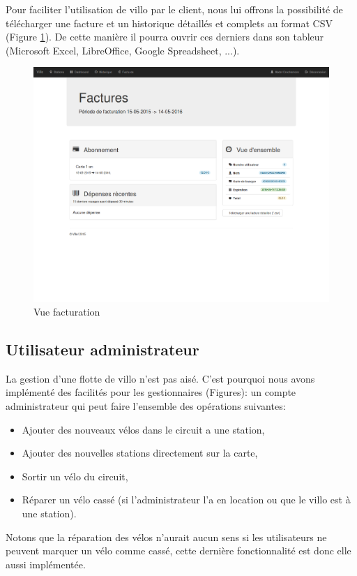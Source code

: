 \documentclass[a4paper,10pt]{article}
\begin{document}
Pour faciliter l'utilisation de villo par le client, nous lui offrons la possibilité
de télécharger une facture et un historique détaillés et complets au format CSV (Figure \ref{fig:factures}).
De cette manière il pourra ouvrir ces derniers dans son tableur (Microsoft Excel,
LibreOffice, Google Spreadsheet, ...).

\begin{figure}[H]
  \centering
  \includegraphics[scale=0.2]{factures.png}
  \caption{\label{fig:factures} Vue facturation}
\end{figure}

\subsection{Utilisateur administrateur}
La gestion d'une flotte de villo n'est pas aisé. C'est pourquoi nous avons implémenté
des facilités pour les gestionnaires (Figures): un compte administrateur qui peut faire
l'ensemble des opérations suivantes: 
\begin{itemize}
	\item Ajouter des nouveaux vélos dans le circuit a une station,
	\item Ajouter des nouvelles stations directement sur la carte,
	\item Sortir un vélo du circuit,
	\item Réparer un vélo cassé (si l'administrateur l'a en location ou que le villo est à une station).
\end{itemize}

Notons que la réparation des vélos n'aurait aucun sens si les utilisateurs ne peuvent
marquer un vélo comme cassé, cette dernière fonctionnalité est donc elle aussi implémentée.
\end{document}
